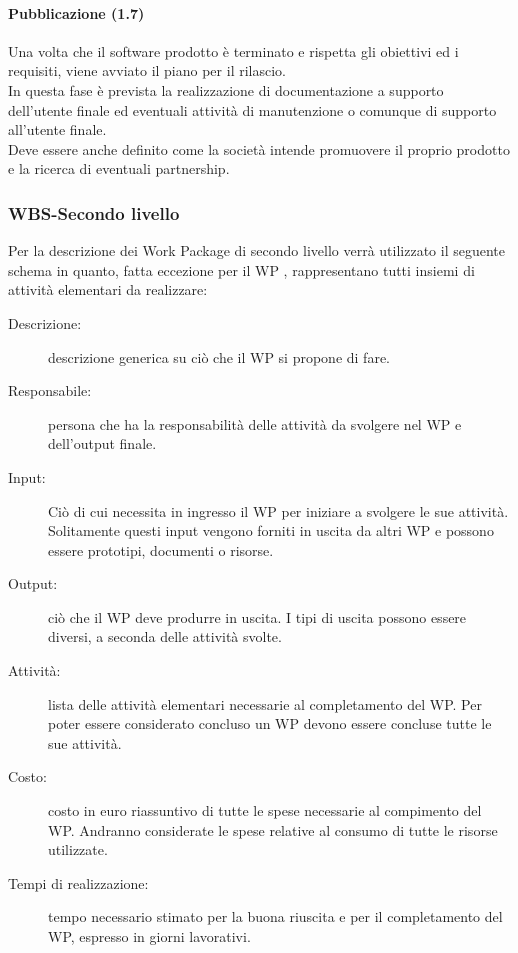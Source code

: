 \paragraph{Pubblicazione (1.7)}
Una volta che il software prodotto è terminato e rispetta gli obiettivi ed i requisiti, viene avviato il piano per il rilascio.\\
In questa fase è prevista la realizzazione di documentazione a supporto dell'utente finale ed eventuali attività di manutenzione o comunque di supporto all'utente finale.\\
Deve essere anche definito come la società intende promuovere il proprio prodotto e la ricerca di eventuali partnership.

\subsubsection {WBS-Secondo livello}
Per la descrizione dei Work Package di secondo livello verrà utilizzato il seguente schema in quanto, fatta eccezione per il WP %
, rappresentano tutti insiemi di attività elementari da realizzare:
\begin{description}
\item[Descrizione:] descrizione generica su ciò che il WP si propone di fare.
\item[Responsabile:] persona che ha la responsabilità delle attività da svolgere nel WP e dell'output finale.
\item[Input:] Ciò di cui necessita in ingresso il WP per iniziare a svolgere le sue attività. Solitamente questi input vengono forniti in uscita da altri WP e possono essere prototipi, documenti o risorse.
\item[Output:] ciò che il WP deve produrre in uscita. I tipi di uscita possono essere diversi, a seconda delle attività svolte.
\item[Attività:] lista delle attività elementari necessarie al completamento del WP. Per poter essere considerato concluso un WP devono essere concluse tutte le sue attività.
\item[Costo:] costo in euro riassuntivo di tutte le spese necessarie al compimento del WP. Andranno considerate le spese relative al consumo di tutte le risorse utilizzate.
\item[Tempi di realizzazione:] tempo necessario stimato per la buona riuscita e per il completamento del WP, espresso in giorni lavorativi.
\end{description}


